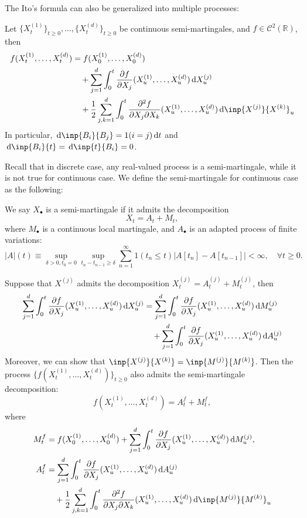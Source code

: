 The Ito's formula can also be generalized into multiple processes:
\begin{theorem}\label{The:12:3}
Let $\{X_t^{(1)}\}_{t\ge0},\ldots, \{X_t^{(d)}\}_{t\ge0}$ be continuous semi-martingales, and $f\in\mathcal{C}^2(\mathbb{R})$, then
\begin{align*}
f(X_t^{(1)},\ldots, X_t^{(d)})&=f(X_0^{(1)},\ldots, X_0^{(d)})\\
&\quad + \sum_{j=1}^d\int_0^t\frac{\partial f}{\partial X_j}(X_u^{(1)},\ldots, X_u^{(d)})\diff X_u^{(j)}\\
&\quad + \frac{1}{2}\sum_{j,k=1}^d\int_0^t\frac{\partial^2 f}{\partial X_j\partial X_k}(X_u^{(1)},\ldots, X_u^{(d)})\diff\inp{X^{(j)}}{X^{(k)}}_u
\end{align*}
In particular, $\diff\inp{B_i}{B_j}=1(i=j)\diff t$ and $\diff\inp{B_i}{t}=\diff\inp{t}{B_i}=0$.
\end{theorem}
Recall that in discrete case, any real-valued process is a semi-martingale, while it is not true for continuous case. We define the semi-martingale for continuous case as the following:
\begin{definition}
We say $X_{\bullet}$ is a semi-martingale if it admits the decomposition
\[
X_t = A_t + M_t,
\]
where $M_{\bullet}$ is a continuous local martingale, and $A_{\bullet}$ is an adapted process of finite variations:
\[
|A|(t)\equiv\sup_{\delta>0, t_0=0}\sup_{t_n - t_{n-1}\ge\delta}
\sum_{n=1}^\infty1(t_n\le t)|A[t_n] - A[t_{n-1}]|<\infty,\quad\forall t\ge0.
\]
\end{definition}

\begin{remark}
Suppose that $X^{(j)}$ admits the decomposition $X^{(j)}_t=A_t^{(j)} + M_t^{(j)}$, then
\begin{align*}
\sum_{j=1}^d\int_0^t\frac{\partial f}{\partial X_j}(X_u^{(1)},\ldots, X_u^{(d)})\,\mathrm{d} X_u^{(j)}
&=\sum_{j=1}^d\int_0^t\frac{\partial f}{\partial X_j}(X_u^{(1)},\ldots, X_u^{(d)})\,\mathrm{d} M_u^{(j)}\\
&\quad + \sum_{j=1}^d\int_0^t\frac{\partial f}{\partial X_j}(X_u^{(1)},\ldots, X_u^{(d)})\,\mathrm{d} A_u^{(j)}
\end{align*}
Moreover, we can show that $\inp{X^{(j)}}{X^{(k)}} = \inp{M^{(j)}}{M^{(k)}}$.
Then the process $\{f(X_t^{(1)},\ldots, X_t^{(d)})\}_{t\ge0}$ also admits the semi-martingale decomposition:
\[
f(X_t^{(1)},\ldots, X_t^{(d)}) = A_t^f + M_t^f,
\]
where
\begin{align*}
M_t^f &= f(X_0^{(1)},\ldots, X_0^{(d)}) + \sum_{j=1}^d\int_0^t\frac{\partial f}{\partial X_j}(X_u^{(1)},\ldots, X_u^{(d)})\diff M_u^{(j)},\\
A_t^f&=\sum_{j=1}^d\int_0^t\frac{\partial f}{\partial X_j}(X_u^{(1)},\ldots, X_u^{(d)})\diff A_u^{(j)}\\
&\quad + \frac{1}{2}\sum_{j,k=1}^d\int_0^t\frac{\partial^2 f}{\partial X_j\partial X_k}(X_u^{(1)},\ldots, X_u^{(d)})\diff\inp{M^{(j)}}{M^{(k)}}_u
\end{align*}
\end{remark}

